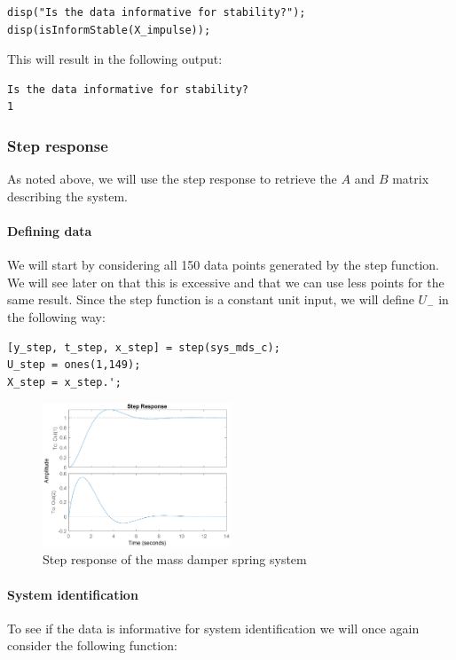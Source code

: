 \begin{lstlisting}
disp("Is the data informative for stability?");
disp(isInformStable(X_impulse));
\end{lstlisting}

This will result in the following output:

\begin{verbatim}
Is the data informative for stability?
1
\end{verbatim}

\subsubsection{Step response}
As noted above, we will use the step response to retrieve the $A$ and $B$ matrix describing the system.

\paragraph{Defining data}
We will start by considering all 150 data points generated by the step function. We will see later on that this is excessive and that we can use less points for the same result. Since the step function is a constant unit input, we will define $U_-$ in the following way:
\begin{lstlisting}
[y_step, t_step, x_step] = step(sys_mds_c);
U_step = ones(1,149);
X_step = x_step.';
\end{lstlisting}

\begin{figure}[H]
	\centering
	\includegraphics[width=0.5\textwidth]{Latex/image/ex-msd/step.eps}
	\caption{Step response of the mass damper spring system}
\end{figure}

\paragraph{System identification}
To see if the data is informative for system identification we will once again consider the following function:
\begin{center}
\end{center}

